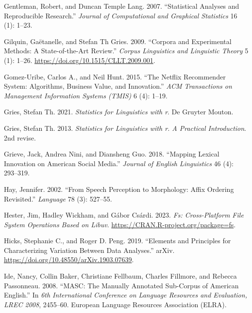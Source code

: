 \documentclass[
  letterpaper,
  DIV=11,
  numbers=noendperiod]{scrreport}
\newlength{\cslhangindent}
\newlength{\cslentryspacingunit} %
\newenvironment{CSLReferences}[2] %
 {%
  \setlength{\parindent}{0pt}
  \ifodd #1
  \let\oldpar\par
  \def\par{\hangindent=\cslhangindent\oldpar}
  \fi
  \setlength{\parskip}{#2\cslentryspacingunit}
 }%
 {}
\theoremstyle{definition}
\theoremstyle{remark}
\begin{document}
\begin{CSLReferences}{1}{0}
\leavevmode{}%
Gentleman, Robert, and Duncan Temple Lang. 2007. {``Statistical Analyses
and Reproducible Research.''} \emph{Journal of Computational and
Graphical Statistics} 16 (1): 1--23.

\leavevmode{}%
Gilquin, Gaëtanelle, and Stefan Th Gries. 2009. {``Corpora and
Experimental Methods: A State-of-the-Art Review.''} \emph{Corpus
Linguistics and Linguistic Theory} 5 (1): 1--26.
\url{https://doi.org/10.1515/CLLT.2009.001}.

\leavevmode{}%
Gomez-Uribe, Carlos A., and Neil Hunt. 2015. {``The Netflix Recommender
System: Algorithms, Business Value, and Innovation.''} \emph{ACM
Transactions on Management Information Systems (TMIS)} 6 (4): 1--19.

\leavevmode{}%
Gries, Stefan Th. 2021. \emph{Statistics for Linguistics with r}. De
Gruyter Mouton.

\leavevmode{}%
Gries, Stefan Th. 2013. \emph{Statistics for Linguistics with r. A
Practical Introduction}. 2nd revise.

\leavevmode{}%
Grieve, Jack, Andrea Nini, and Diansheng Guo. 2018. {``Mapping Lexical
Innovation on American Social Media.''} \emph{Journal of English
Linguistics} 46 (4): 293--319.

\leavevmode{}%
Hay, Jennifer. 2002. {``From Speech Perception to Morphology: Affix
Ordering Revisited.''} \emph{Language} 78 (3): 527--55.

\leavevmode{}%
Hester, Jim, Hadley Wickham, and Gábor Csárdi. 2023. \emph{Fs:
Cross-Platform File System Operations Based on Libuv}.
\url{https://CRAN.R-project.org/package=fs}.

\leavevmode{}%
Hicks, Stephanie C., and Roger D. Peng. 2019. {``Elements and Principles
for Characterizing Variation Between Data Analyses.''} arXiv.
\url{https://doi.org/10.48550/arXiv.1903.07639}.

\leavevmode{}%
Ide, Nancy, Collin Baker, Christiane Fellbaum, Charles Fillmore, and
Rebecca Passonneau. 2008. {``MASC: The Manually Annotated Sub-Corpus of
American English.''} In \emph{6th International Conference on Language
Resources and Evaluation, LREC 2008}, 2455--60. European Language
Resources Association (ELRA).


\end{CSLReferences}
\end{document}
